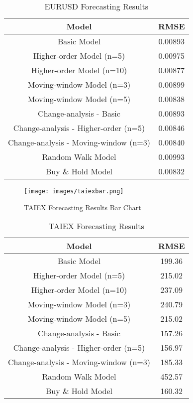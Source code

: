 \documentclass[12pt, oneside, a4paper]{article}
\theoremstyle{definition}
\begin{document}
\begin{table}[H]
	\center
	\begin{tabulary}{1.0\textwidth}{CC}
	\toprule[.15em]
	Model & RMSE \\
	\toprule[.15em]
	Basic Model & 0.00893 \\
	\hline
	Higher-order Model (n=5) & 0.00975\\
	\hline
	Higher-order Model (n=10) & 0.00877\\
	\hline
	Moving-window Model (n=3) & 0.00899\\
	\hline
	Moving-window Model (n=5) & 0.00838\\
	\hline
	Change-analysis - Basic & 0.00893\\
	\hline
	Change-analysis - Higher-order (n=5) & 0.00846\\
	\hline
	Change-analysis - Moving-window (n=3) & 0.00840\\
	\hline
	Random Walk Model & 0.00993\\
	\hline
	Buy \& Hold Model & 0.00832\\
  	\toprule[.15em]
	\end{tabulary}
	\caption{EURUSD Forecasting Results}
	\label{eurusdresults}
\end{table}

\begin{figure}[H]
    \centering
    \caption{TAIEX Forecasting Results Bar Chart}
    \texttt{[image: images/taiexbar.png]}
    \label{taiexbar}
\end{figure}

\begin{table}[H]
	\center
	\begin{tabulary}{1.0\textwidth}{CC}
	\toprule[.15em]
	Model & RMSE \\
	\toprule[.15em]
	Basic Model & 199.36 \\
	\hline
	Higher-order Model (n=5) & 215.02\\
	\hline
	Higher-order Model (n=10) & 237.09\\
	\hline
	Moving-window Model (n=3) & 240.79\\
	\hline
	Moving-window Model (n=5) & 215.02\\
	\hline
	Change-analysis - Basic & 157.26\\
	\hline
	Change-analysis - Higher-order (n=5) & 156.97\\
	\hline
	Change-analysis - Moving-window (n=3) & 185.33\\
	\hline
	Random Walk Model & 452.57\\
	\hline
	Buy \& Hold Model & 160.32\\
  	\toprule[.15em]
	\end{tabulary}
	\caption{TAIEX Forecasting Results}
	\label{taiexresults}
\end{table}
\end{document}
